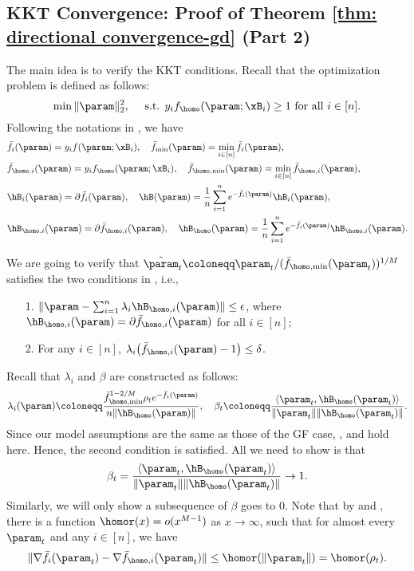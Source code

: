 \subsection{KKT Convergence: Proof of Theorem \ref{thm: directional convergence-gd} (Part 2)}\label{sec:KKT_convergence_gd}
The main idea is to verify the KKT conditions. Recall that the optimization problem  is defined as follows: 
\[
    \min  \| \param\|_2^2, \quad \text{ s.t. } y_i f_\homo (\param;\xB_i) \ge 1 \text{ for all } i\in [n]. 
\]
Following the notations in , we have 
\begin{align*}
    &\bar f_i (\param ) = y_i f(\param ;\xB_i), \quad \bar f_{\min} (\param ) = \min_{i\in [n]} \bar f_i (\param ),\\ 
    &\bar f_{\homo,i} (\param ) = y_i f_\homo(\param ;\xB_i), \quad \bar f_{\homo,\min} (\param ) = \min_{i\in [n]} \bar f_{\homo,i} (\param ),\\ 
    &\hB_i(\param ) = \partial \bar{f}_i(\param ), \quad \hB (\param )= \frac{1}{n} \sum_{i=1}^{n} e^{-\bar f_i(\param )} \hB_i(\param ), \\  
    &\hB_{\homo,i}(\param ) = \partial \bar{f}_{\homo,i}(\param ), \quad \hB_{\homo} (\param )= \frac{1}{n} \sum_{i=1}^{n} e^{-\bar f_i(\param )} \hB_{\homo,i}(\param ). 
\end{align*}

We are going to verify that $\hat \param_t \coloneqq \param_t / (\bar f_{\homo, \min} (\param_t))^{1/M}$ satisfies the two conditions in , i.e., 
\begin{itemize}
    \item [1.] $\|\param - \sum_{i=1}^n \lambda_i \hB_{\homo,i} (\param) \| \le \epsilon $, where $\hB_{\homo,i} (\param) = \partial \bar{f}_{\homo,i}(\param)$ for all $i\in [n]$;
    \item [2.]For any $i\in [n]$, $\lambda_i \big( \bar f_{\homo,i}(\param ) -1 \big) \le \delta $. 
\end{itemize}
Recall that $\lambda_i$ and $\beta$ are constructed as follows:
\begin{align*}
    \lambda_i(\param ) \coloneqq \frac{\bar f_{\homo,\min}^{1-2 / M} \rho_t e^{-\bar f_i(\param )}}{n \| \hB_{\homo} (\param) \|} , \quad 
    \beta_t \coloneqq \frac{\langle \param_t, \hB_{\homo} (\param_t)  \rangle }{ \| \param_t \| \|\hB_{\homo}(\param_t)\|}.
\end{align*}
Since our model assumptions are the same as those of the GF case, ,  and  hold here. Hence, the second condition is satisfied. All we need to show is that 
\[
    \beta_t = \frac{\langle \param_t, \hB_{\homo} (\param_t)  \rangle }{ \| \param_t \| \|\hB_{\homo}(\param_t)\|} \to 1. 
\] 
Similarly, we will only show a subsequence of $\beta$ goes to $0$. Note that by  and , there is a function $\homor(x) = o(x^{M-1})$ as $x \to \infty$, such that for almost every $\param_t$ and any $i\in [n]$, we have
\[
\| \nabla \bar f_{i}(\param_t) - \nabla \bar f_{\homo,i}(\param_t)\| \le \homor(\|\param_t\|) = \homor(\rho_t) .
\]

